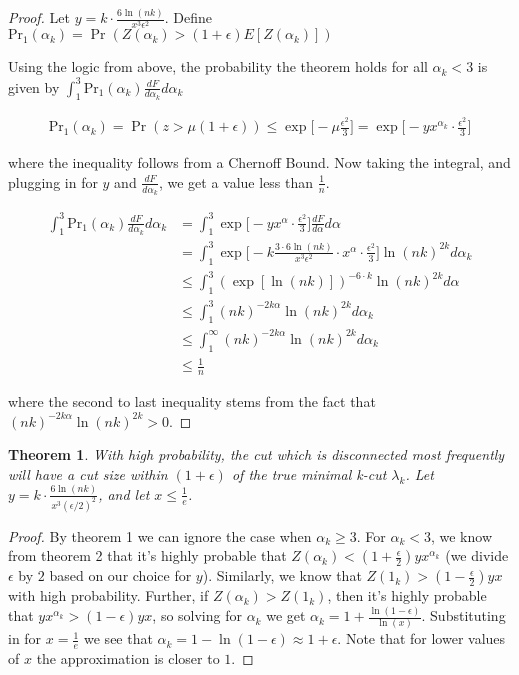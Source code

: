 \documentclass[12pt]{article}
\newtheorem{theorem}{Theorem}
\begin{document}
\begin{proof}
Let $y = k \cdot \frac{6 \ln(nk)}{x^3 \epsilon^2}$. Define $\text{Pr}_1(\alpha_k) = \Pr(Z(\alpha_k) > (1+\epsilon) E[Z(\alpha_k)])$

Using the logic from above, the probability the theorem holds for all $\alpha_k < 3$ is given by $\int_{1}^3 \text{Pr}_1(\alpha_k) \frac{dF}{d \alpha_k} d\alpha_k$

\begin{align*}
\text{Pr}_1(\alpha_k) = \Pr(z > \mu(1 + \epsilon)) \leq \exp \bigg[ -\mu \frac{\epsilon^2}{3}\bigg] = \exp \bigg[-y x^{\alpha_k} \cdot \frac{\epsilon^2}{3} \bigg]
\end{align*}

where the inequality follows from a Chernoff Bound. Now taking the integral, and plugging in for $y$ and $\frac{dF}{d \alpha_k}$, we get a value less than $\frac{1}{n}$.

\begin{align*}
\int_{1}^3 \text{Pr}_1(\alpha_k) \frac{dF}{d \alpha_k} d\alpha_k &= \int_{1}^3 \exp \bigg[-y x^\alpha \cdot \frac{\epsilon^2}{3} \bigg] \frac{dF}{d \alpha} d\alpha \\
&= \int_{1}^{3} \exp \bigg[-k \frac{3 \cdot 6 \ln (nk)}{x^3 \epsilon^2} \cdot x^\alpha \cdot \frac{\epsilon^2}{3}\bigg] \ln(nk)^{2k} d\alpha_k \\
&\leq \int_{1}^3 (\exp[\ln(nk)])^{-6\cdot k} \ln(nk)^{2k} d\alpha \\
&\leq \int_{1}^3 (nk)^{-2 k \alpha} \ln(nk)^{2k} d\alpha_k \\
&\leq \int_{1}^\infty (nk)^{-2k \alpha} \ln(nk)^{2k} d\alpha_k \\
&\leq \frac{1}{n}
\end{align*}

where the second to last inequality stems from the fact that \newline $(nk)^{-2k \alpha} \ln(nk)^{2k}  > 0$.

\end{proof}

\begin{theorem}
With high probability, the cut which is disconnected most frequently will have a cut size within $(1+\epsilon)$ of the true minimal k-cut $\lambda_k$. Let $y = k \cdot \frac{6 \ln(nk)}{x^3 (\epsilon/2)^2}$, and let $x \leq \frac{1}{e}$.
\end{theorem}

\begin{proof}
By theorem 1 we can ignore the case when $\alpha_k \geq 3$. For $\alpha_k < 3$, we know from theorem 2 that it's highly probable that $Z(\alpha_k) < (1+\frac{\epsilon}{2})yx^{\alpha_k}$ (we divide $\epsilon$ by $2$ based on our choice for $y$).
Similarly, we know that $Z(1_k) > (1-\frac{\epsilon}{2}) yx$ with high probability. Further, if $Z(\alpha_k) > Z(1_k)$, then it's highly probable that $yx^{\alpha_k} > (1-\epsilon) yx$, so solving for $\alpha_k$ we get $\alpha_k = 1 + \frac{\ln(1-\epsilon)}{\ln(x)}$. Substituting in for $x = \frac{1}{e}$ we see that $\alpha_k = 1 - \ln(1 - \epsilon) \approx 1+\epsilon$. Note that for lower values of $x$ the approximation is closer to $1$.
\end{proof}
\end{document}
